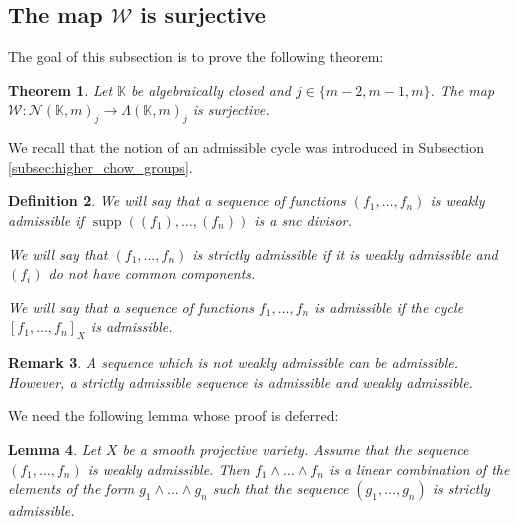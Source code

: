 \documentclass[12pt]{extarticle}
\newtheorem{theorem}{Theorem}[section]
\newtheorem{lemma}[theorem]{Lemma}
\newtheorem{definition}[theorem]{Definition}
\newtheorem{remark}[theorem]{Remark}
\def\mb{\mathbb}
\def\mc{\mathcal}
\def\L{\Lambda}
\def\k{\mb K}
\def\N{\mc N}
\def\cl{\colon}
\def\wdw{\wedge\dots\wedge}
\DeclareMathOperator{\supp}{supp}
\begin{document}
\subsection{The map $\mc W$ is surjective}
\label{sec:W_surjective}
The goal of this subsection is to prove the following theorem:

\begin{theorem}
\label{th:W_is_surjective}
    Let $\k$ be algebraically closed and $j\in\{m-2,m-1,m\}$. The map $\mc W\cl\N(\k,m)_j\to\L(\k,m)_j$ is surjective.
\end{theorem}

We recall that the notion of an admissible cycle was introduced in Subsection \ref{subsec:higher_chow_groups}.

\begin{definition}
    We will say that a sequence of functions $(f_1,\dots, f_n)$ is weakly admissible if $\supp((f_1),\dots, (f_n))$ is a snc divisor.

    We will say that $(f_1,\dots, f_n)$ is strictly admissible if it is weakly admissible and $(f_i)$ do not have common components.

    We will say that a sequence of functions $f_1,\dots, f_n$ is admissible if the cycle $[f_1,\dots, f_n]_X$ is admissible. 
\end{definition}

\begin{remark}
    A sequence which is not weakly admissible can be admissible. However, a  strictly admissible sequence is admissible and weakly admissible.
\end{remark}

We need the following lemma whose proof is deferred:

\begin{lemma}
\label{lemma:globally_strictly_regular}
    Let $X$ be a smooth projective variety. Assume that the sequence $(f_1,\dots, f_n)$ is weakly admissible. Then $f_1\wdw f_n$ is a linear combination of the elements of the form $g_1\wdw g_n$ such that the sequence $(g_1,\dots, g_n)$ is strictly admissible.
\end{lemma}
\end{document}
